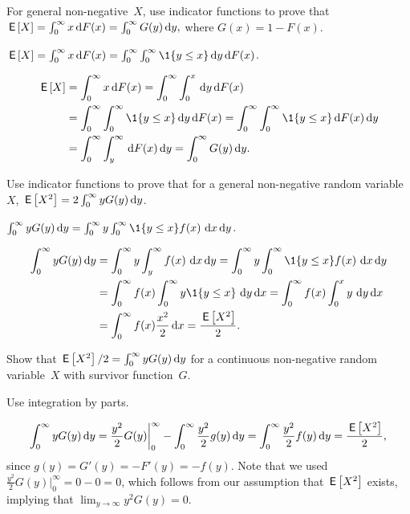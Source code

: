 \documentclass[queueing-book.tex]{subfiles}
\begin{document}
\begin{exercise}\label{ex:l-107}
For  general non-negative~$X$,  use indicator functions to prove that
$ \,\mathsf{E}\left[X\right] = \int_0^\infty x \,\textrm{d}F(x) = \int_0^\infty G(y) \,\textrm{d}y,$
where $G(x) = 1 - F(x)$.
\begin{hint}
$\E X = \int_0^\infty x \d F( x) = \int_0^\infty \int_0^\infty \1{y\leq x} \d y \d F(x)$.
\end{hint}
\begin{solution}
 \begin{align*}
 \E{X} &= \int_0^\infty x \d F(x) = \int_0^\infty \int_0^x \d y \d F(x) \\
 & = \int_0^\infty \int_0^\infty \1{y\leq x} \d y \d F(x) = \int_0^\infty \int_0^\infty \1{y\leq x} \d F(x) \d y\\
 & = \int_0^\infty \int_y^\infty\d  F(x) \d y = \int_0^\infty G(y) \d y.
 \end{align*}
\end{solution}
\end{exercise}


\begin{exercise}\label{ex:14}
  Use indicator functions to prove that for a general non-negative random variable~$X$, $ \,\mathsf{E}\left[X^2\right] = 2 \int_0^\infty y G(y) \,\textrm{d}y$.
\begin{hint}
$\int_0^\infty y G(y) \d y = \int_0^\infty y \int_0^\infty \1{y\leq x}f(x)\, \d x \d y$.
\end{hint}
\begin{solution}
 \begin{align*}
\int_0^\infty y G(y) \d y
&= \int_0^\infty y \int_y^\infty f(x)\, \d x \d y = \int_0^\infty y \int_0^\infty \1{y\leq x}f(x)\, \d x \d y\\
&= \int_0^\infty f(x) \int_0^\infty y \1{y \leq x}\, \d y \d x
= \int_0^\infty f(x) \int_0^x y\, \d y \d x\\
&= \int_0^\infty f(x) \frac{x^2}2 \d x =\frac{\E{X^2}}2.
 \end{align*}
\end{solution}
\end{exercise}

\begin{exercise}\label{ex:l-108}
 Show that $\,\mathsf{E}\left[X^2\right]/2 = \int_0^\infty y G(y) \,\textrm{d}y$ for a continuous non-negative random variable~$X$ with survivor function~$G$.
 \begin{solution}
 \begin{hint}
 Use integration by parts.
 \end{hint}
 \begin{equation*}
 \int_0^\infty y G(y) \,\textrm{d}y
= \frac{y^2}2 G(y) \bigg|_0^\infty - \int_0^\infty \frac{y^2}2 g(y)\,\textrm{d}y = \int_0^\infty \frac{y^2}2 f(y)\,\textrm{d}y = \frac{\,\mathsf{E}\left[X^2\right]}2,
 \end{equation*}
 since $g(y) = G'(y) = - F'(y) = - f(y)$. Note that we used $\frac{y^2}2 G(y) \bigg|_0^\infty = 0 - 0 = 0$, which follows from our assumption that $\,\mathsf{E}\left[X^2\right]$ exists, implying that $\lim_{y \to \infty} y^2G(y) = 0$.
\end{solution}
\end{exercise}
\end{document}
